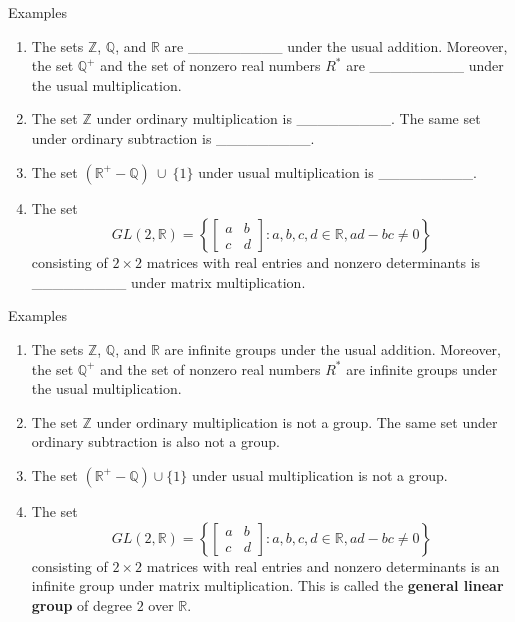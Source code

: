 \documentclass{beamer}
\begin{document}
\begin{frame}{Examples}
\begin{enumerate}
\justifying
\item The sets $\mathbb{Z}$, $\mathbb{Q}$, and $\mathbb{R}$ are \_\_\_\_\_\_\_\_\_ under the usual addition. Moreover, the set $\mathbb{Q}^+$ and the set of nonzero real numbers $R^{*}$ are \_\_\_\_\_\_\_\_\_ under the usual multiplication.
\item The set $\mathbb{Z}$ under ordinary multiplication is \_\_\_\_\_\_\_\_\_. The same set under ordinary subtraction is \_\_\_\_\_\_\_\_\_. 
\item The set $\left(\mathbb{R}^+ - \mathbb{Q}\right) \ \cup \ \{1\}$ under usual multiplication is \_\_\_\_\_\_\_\_\_.  
\item The set
\[
GL(2, \mathbb{R}) = \left\{\begin{bmatrix}a & b \\ c & d\end{bmatrix} : a, b, c, d \in \mathbb{R}, ad - bc \neq 0\right\}
\]
consisting of $2 \times 2$ matrices with real entries and nonzero determinants is \_\_\_\_\_\_\_\_\_ under matrix multiplication.
\end{enumerate}    
\end{frame}

\begin{frame}{Examples}
\begin{enumerate}
\justifying
\item The sets $\mathbb{Z}$, $\mathbb{Q}$, and $\mathbb{R}$ are infinite groups under the usual addition. Moreover, the set $\mathbb{Q}^+$ and the set of nonzero real numbers $R^{*}$ are infinite groups under the usual multiplication.
\item The set $\mathbb{Z}$ under ordinary multiplication is not a group. The same set under ordinary subtraction is also not a group. 
\pause
\item The set $\left(\mathbb{R}^+ - \mathbb{Q}\right) \cup \{1\}$ under usual multiplication is not a group.  
\pause
\item The set
\[
GL(2, \mathbb{R}) = \left\{\begin{bmatrix}a & b \\ c & d\end{bmatrix} : a, b, c, d \in \mathbb{R}, ad - bc \neq 0\right\}
\]
consisting of $2 \times 2$ matrices with real entries and nonzero determinants is an infinite group under matrix multiplication. This is called the \textbf{general linear group} of degree $2$ over $\mathbb{R}$.
\end{enumerate}    
\end{frame}
\end{document}
